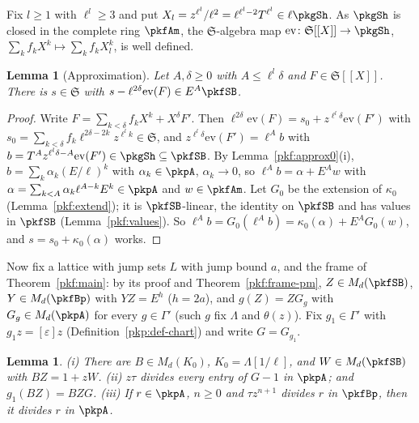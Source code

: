 \documentclass[10pt]{amsart}
\newtheorem{lemma}[theorem]{Lemma}
\theoremstyle{definition}
\theoremstyle{remark}
\begin{document}
Fix $l\ge1$ with $\ell^l\ge3$ and put $X_l=z^{\ell^l}/\ell^2=\ell^{\ell^l-2}T^{\ell^l}\in\ell\pkgSh$. As
$\pkgSh$ is closed in the complete ring $\pkfAm$, the $\mathfrak S$-algebra map
$\mathrm{ev}\colon\mathfrak S[[X]]\to\pkgSh$, $\sum_kf_kX^k\mapsto\sum_kf_kX_l^k$, is well defined.

\begin{lemma}[Approximation]\label{pkg:approx}
Let $A,\delta\ge0$ with $A\le\ell^l\delta$ and $F\in\mathfrak S[[X]]$. There is $s\in\mathfrak S$ with
$s-\ell^{2\delta}\mathrm{ev}(F)\in E^A\pkfSB$.
\end{lemma}

\begin{proof}
Write $F=\sum_{k<\delta}f_kX^k+X^\delta F'$. Then $\ell^{2\delta}\mathrm{ev}(F)=s_0+z^{\ell^l\delta}\mathrm{ev}(F')$
with $s_0=\sum_{k<\delta}f_k\ell^{2\delta-2k}z^{\ell^lk}\in\mathfrak S$, and
$z^{\ell^l\delta}\mathrm{ev}(F')=\ell^Ab$ with $b=T^Az^{\ell^l\delta-A}\mathrm{ev}(F')\in\pkgSh\subseteq\pkfSB$.
By Lemma~\ref{pkf:approx0}(i), $b=\sum_k\alpha_k(E/\ell)^k$ with $\alpha_k\in\pkpA$, $\alpha_k\to0$, so
$\ell^Ab=\alpha+E^Aw$ with $\alpha=\sum_{k<A}\alpha_k\ell^{A-k}E^k\in\pkpA$ and $w\in\pkfAm$. Let $G_0$ be the
extension of $\kappa_0$ (Lemma~\ref{pkf:extend}); it is $\pkfSB$-linear, the identity on $\pkfSB$ and has
values in $\pkfSB$ (Lemma~\ref{pkf:values}). So $\ell^Ab=G_0(\ell^Ab)=\kappa_0(\alpha)+E^AG_0(w)$, and
$s=s_0+\kappa_0(\alpha)$ works.
\end{proof}

Now fix a lattice with jump sets $L$ with jump bound $a$, and the frame of Theorem~\ref{pkf:main}: by its
proof and Theorem~\ref{pkf:frame-pm}, $Z\in M_d(\pkfSB)$, $Y\in M_d(\pkfBp)$ with $YZ=E^h$ ($h=2a$), and
$g(Z)=ZG_g$ with $G_g\in M_d(\pkpA)$ for every $g\in\Gamma'$ (such $g$ fix $\Lambda$ and $\theta(z)$). Fix
$g_1\in\Gamma'$ with $g_1z=[\varepsilon]z$ (Definition~\ref{pkp:def-chart}) and write $G=G_{g_1}$.

\begin{lemma}\label{pkg:BW}
(i) There are $B\in M_d(K_0)$, $K_0=\Lambda[1/\ell]$, and $W\in M_d(\pkfSB)$ with $BZ=1+zW$.
(ii) $z\tau$ divides every entry of $G-1$ in $\pkpA$; and $g_1(BZ)=BZG$.
(iii) If $r\in\pkpA$, $n\ge0$ and $\tau z^{n+1}$ divides $r$ in $\pkfBp$, then it divides $r$ in $\pkpA$.
\end{lemma}
\end{document}
